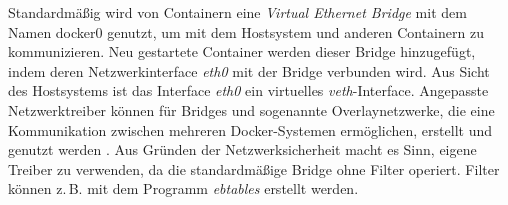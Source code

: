 \documentclass[../main.tex]{subfiles}
\begin{document}
			Standardmäßig wird von Containern eine \emph{Virtual Ethernet Bridge} mit dem Namen docker0 genutzt, um mit dem Hostsystem und anderen Containern zu kommunizieren. Neu gestartete Container werden dieser Bridge hinzugefügt, indem deren Netzwerkinterface \emph{eth0} mit der Bridge verbunden wird. Aus Sicht des Hostsystems ist das Interface \emph{eth0} ein virtuelles \emph{veth}-Interface. Angepasste Netzwerktreiber können für Bridges und sogenannte Overlaynetzwerke, die eine Kommunikation zwischen mehreren Docker-Systemen ermöglichen, erstellt und genutzt werden \cite[S.3]{virtVSContainer}\cite{dockerNetworking}. Aus Gründen der Netzwerksicherheit macht es Sinn, eigene Treiber zu verwenden, da die standardmäßige Bridge ohne Filter operiert. Filter können z.\,B. mit dem Programm \emph{ebtables} erstellt werden.




\end{document}
